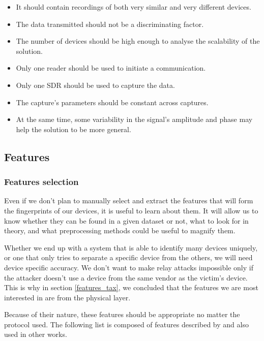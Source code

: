 \begin{itemize}
  \item It should contain recordings of both very similar and very different devices.
  \item The data transmitted should not be a discriminating factor.
  \item The number of devices should be high enough to analyse the scalability of the solution.
  \item Only one reader should be used to initiate a communication.
  \item Only one SDR should be used to capture the data.
  \item The capture's parameters should be constant across captures.
  \item At the same time, some variability in the signal's amplitude and phase may help the solution to be more general.
\end{itemize}

\subsection{Features}

\subsubsection{Features selection}

Even if we don't plan to manually select and extract the features that will form the fingerprints of our devices, it is useful to learn about them. It will allow us to know whether they can be found in a given dataset or not, what to look for in theory, and what preprocessing methods could be useful to magnify them.

Whether we end up with a system that is able to identify many devices uniquely, or one that only tries to separate a specific device from the others, we will need device specific accuracy. We don't want to make relay attacks impossible only if the attacker doesn't use a device from the same vendor as the victim's device. This is why in section \ref{features_tax}, we concluded that the features we are most interested in are from the physical layer.

Because of their nature, these features should be appropriate no matter the protocol used. The following list is composed of features described by \textcite{riyaz_deep_2018} and also used in other works.

